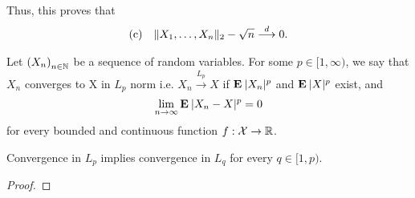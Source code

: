 Thus, this proves that
\[ \everymath{\displaystyle}
\begin{array}{cc}
    \text{(c)} & \|X_1, \ldots, X_n\|_2-\sqrt{n} \overset{d}{\longrightarrow} 0.
\end{array} \]

\begin{definition}[Convergence in $L_p$]
    Let ${(X_n)}_{n\in \mathbb{N}}$ be a sequence of random variables. For some $p \in [1,\infty)$, we say that $X_n$ converges to X in $L_p$ norm i.e. $X_n \overset{L_p}{\to} X$ if $\mathbf{E}\: |X_n|^p$ and $\mathbf{E}\: |X|^p$ exist, and
    \[ \lim_{n\to\infty} \mathbf{E}\: |X_n - X|^p = 0\]
    for every bounded and continuous function $f : \mathcal{X}\to \mathbb{R}$.
\end{definition}

\begin{theorem}[Exercise 1.d.]
Convergence in $L_p$ implies convergence in $L_q$ for every $q\in [1,p)$.
\end{theorem}
\begin{proof}

\end{proof}